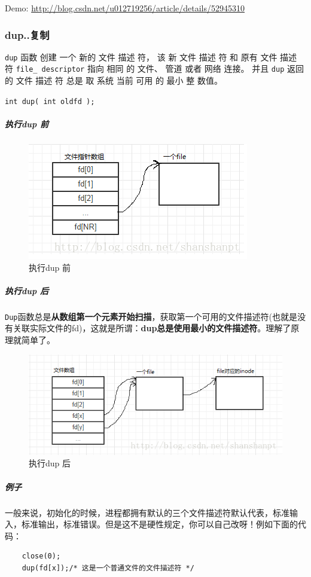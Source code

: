 \documentclass[UTF8,a4paper,12pt]{ctexbook}
\begin{document}
				Demo: \url{http://blog.csdn.net/u012719256/article/details/52945310}
				
			\subsubsection{dup..复制}\verb|dup| 函数 创建 一个 新的 文件 描述 符， 该 新 文件 描述 符 和 原有 文件 描述 符 \verb|file_ descriptor| 指向 相同 的 文件、 管道 或者 网络 连接。 并且 \verb|dup| 返回 的 文件 描述 符 总是 取 系统 当前 可用 的 最小 整 数值。
			
				\verb|int dup( int oldfd ); |
				\subparagraph{执行dup 前}
				
					\begin{figure}[h]
						\centering
						\includegraphics*[scale = 0.8]{figures/orgi.png}
						\caption{执行dup 前}
					\end{figure}
				
				\subparagraph{执行dup 后}
					\verb|Dup|函数总是\textbf{从数组第一个元素开始扫描}，获取第一个可用的文件描述符(也就是没有关联实际文件的fd)，这就是所谓：\textbf{dup总是使用最小的文件描述符}。理解了原理就简单了。
					
					\begin{figure}[h]
						\centering
						\includegraphics*[scale = 0.8]{figures/after.png}
						\caption{执行dup 后}
					\end{figure}
					
				\subparagraph{例子}一般来说，初始化的时候，进程都拥有默认的三个文件描述符默认代表，标准输入，标准输出，标准错误。但是这不是硬性规定，你可以自己改呀！例如下面的代码：
					\begin{lstlisting}
	close(0);
	dup(fd[x]);/* 这是一个普通文件的文件描述符 */
					\end{lstlisting}	
			
\end{document}
